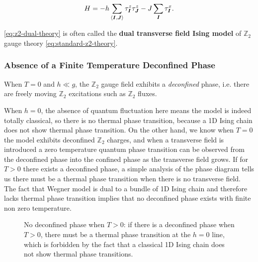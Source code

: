 \documentclass[hyperref, a4paper]{article}
\newcommand*{\pair}[1]{\langle #1 \rangle}
\newcommand*{\concept}[1]{{\textbf{#1}}}
\newcommand*{\Ztwo}{$\mathbb{Z}_2$ }
\newcommand*{\tfim}{transverse field Ising model }
\begin{document}
\begin{equation}
    H = - h \sum_{\pair{\vb*{I}, \vb*{J}}} \tau^z_{\vb*{I}} \tau^z_{\vb*{J}} - J \sum_{\vb*{I}} \tau^x_{\vb*{I}}.
    \label{eq:z2-dual-theory}
\end{equation}

\eqref{eq:z2-dual-theory} is often called the \concept{dual \tfim} of \Ztwo gauge theory \eqref{eq:standard-z2-theory}.

\subsubsection{Absence of a Finite Temperature Deconfined Phase}\label{sec:absence-of-z2-deconfined-phase}

When $T=0$ and $h \ll g$, the \Ztwo gauge field exhibits a \emph{deconfined} phase, i.e. there are freely moving \Ztwo excitations such as \Ztwo fluxes.

When $h = 0$, the absence of quantum fluctuation here means the model is indeed totally classical, so there is no thermal phase transition, because a 1D Ising chain does not show thermal phase transition.
On the other hand, we know when $T=0$ the model exhibits deconfined \Ztwo charges, and when a transverse field is introduced a zero temperature quantum phase transition can be observed from the deconfined phase into the confined phase as the transverse field grows.
If for $T > 0$ there exists a deconfined phase, a simple analysis of the phase diagram tells us there must be a thermal phase transition when there is no transverse field.
The fact that Wegner model is dual to a bundle of 1D Ising chain and therefore lacks thermal phase transition implies that no deconfined phase exists with finite non zero temperature.

\begin{figure}
    \centering
    
    \caption{No deconfined phase when $T > 0$: if there is a deconfined phase when $T > 0$, there must be a thermal phase transition at the $h=0$ line, which is forbidden by the fact that a classical 1D Ising chain does not show thermal phase transitions.}
\end{figure}
\end{document}
